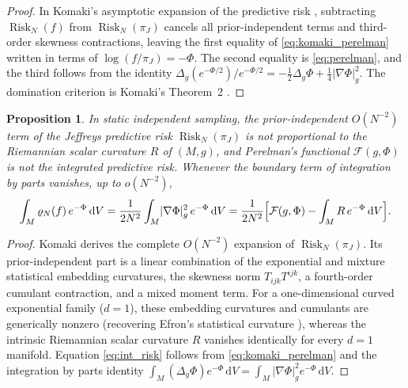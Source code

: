 \documentclass[a4paper,11pt,noarxiv]{quantumarticle}
\newcommand{\Risk}{\operatorname{Risk}}
\newcommand{\abs}[1]{\lvert #1\rvert}
\newcommand{\dd}{\,\mathrm{d}}
\newcommand{\grad}{\nabla}
\theoremstyle{plain}
\newtheorem{proposition}[theorem]{Proposition}
\theoremstyle{definition}
\theoremstyle{remark}
\begin{document}
\begin{proof}
In Komaki's asymptotic expansion of the predictive risk \cite[eqs.\
(3)--(5)]{komaki2006}, subtracting $\Risk_N(f)$ from $\Risk_N(\pi_J)$
cancels all prior-independent terms and third-order skewness
contractions, leaving the first equality of \eqref{eq:komaki_perelman}
written in terms of $\log(f/\pi_J)=-\Phi$. The second equality is
\eqref{eq:perelman}, and the third follows from the identity
$\Delta_g(e^{-\Phi/2})/e^{-\Phi/2}=-\tfrac12\Delta_g\Phi+\tfrac14\abs{\grad\Phi}_g^2$.
The domination criterion is Komaki's Theorem~2 \cite{komaki2006}.
\end{proof}

\begin{proposition}\label{prop:no_R}
In static independent sampling, the prior-independent $O(N^{-2})$ term
of the Jeffreys predictive risk $\Risk_N(\pi_J)$ is not proportional to
the Riemannian scalar curvature $R$ of $(M,g)$, and Perelman's
functional $\mathcal F(g,\Phi)$ is not the integrated predictive risk.
Whenever the boundary term of integration by parts vanishes, up to
$o(N^{-2})$,
\begin{equation}\label{eq:int_risk}
\int_M\varrho_N(f)\,e^{-\Phi}\dd V
=\frac{1}{2N^2}\int_M\abs{\grad\Phi}_g^2\,e^{-\Phi}\dd V
=\frac{1}{2N^2}\Bigl[\mathcal F(g,\Phi)-\int_M R\,e^{-\Phi}\dd V\Bigr].
\end{equation}
\end{proposition}

\begin{proof}
Komaki \cite[Theorem A1, eq.\ (29)]{komaki2015} derives the complete
$O(N^{-2})$ expansion of $\Risk_N(\pi_J)$. Its prior-independent part is
a linear combination of the exponential and mixture statistical
embedding curvatures, the skewness norm $T_{ijk}T^{ijk}$, a fourth-order
cumulant contraction, and a mixed moment term. For a one-dimensional
curved exponential family ($d=1$), these embedding curvatures and
cumulants are generically nonzero (recovering Efron's statistical
curvature \cite{efron1975}), whereas the intrinsic Riemannian scalar
curvature $R$ vanishes identically for every $d=1$ manifold. Equation
\eqref{eq:int_risk} follows from \eqref{eq:komaki_perelman} and the
integration by parts identity
$\int_M(\Delta_g\Phi)e^{-\Phi}\dd V=\int_M\abs{\grad\Phi}_g^2e^{-\Phi}\dd V$.
\end{proof}
\end{document}
